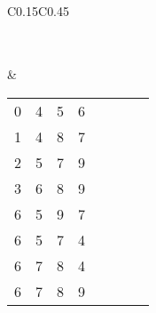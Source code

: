 \begin{longtable}{C{0.15\textwidth}C{0.45\textwidth}}
\begin{tabular}{p{}p{}p{}p{}p{}p{}p{}p{}}
\end{tabular}
\\ & 
\begin{tabular}{p{}p{}p{}p{}p{}p{}p{}p{}}
0 & 4 & 5 & 6 &  &  &  & \\
1 & 4 & 8 & 7 &  &  &  & \\
2 & 5 & 7 & 9 &  &  &  & \\
3 & 6 & 8 & 9 &  &  &  & \\
6 & 5 & 9 & 7 &  &  &  & \\
6 & 5 & 7 & 4 &  &  &  & \\
6 & 7 & 8 & 4 &  &  &  & \\
6 & 7 & 8 & 9 &  &  &  & \\
\end{tabular}
  \end{longtable}
\endgroup